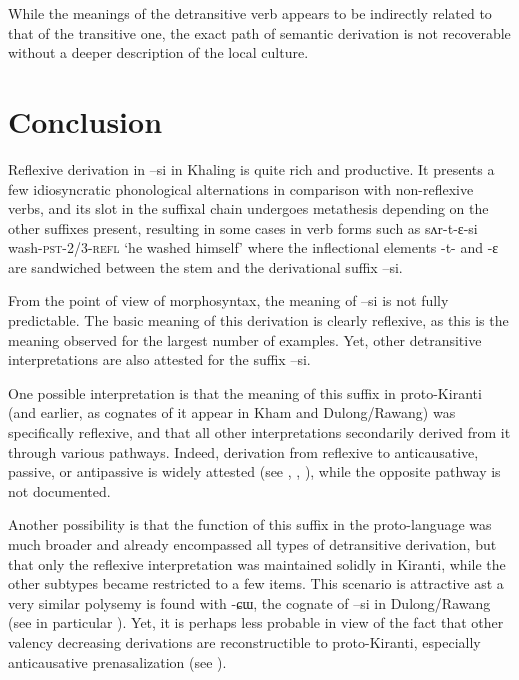 \documentclass[twoside,a4paper,11pt]{article}
\newcommand{\ipa}[1]{{\phon#1}}
\begin{document}
While the meanings of the detransitive verb appears to be indirectly related to that of the transitive one, the exact path of semantic derivation is not recoverable without a deeper description of the local culture.

\section{Conclusion}
Reflexive derivation in \ipa{--si} in Khaling is quite rich and productive. It  presents a few idiosyncratic phonological alternations in comparison with non-reflexive verbs, and its slot in the suffixal chain undergoes metathesis depending on the other suffixes present,  resulting in some cases in verb forms such as \ipa{sʌr-t-ɛ-si} wash-\textsc{pst-2/3-refl} `he washed himself' where the inflectional elements \ipa{-t-} and \ipa{-ɛ} are sandwiched between the stem and the derivational suffix \ipa{--si}.

From the point of view of morphosyntax, the meaning of  \ipa{--si}  is not fully predictable. The basic meaning of this derivation is clearly reflexive, as this is the meaning observed for the largest number of examples. Yet, other detransitive interpretations are also attested for the suffix \ipa{--si}. 

One possible interpretation is that the meaning of this suffix in proto-Kiranti (and earlier, as cognates of it appear in Kham and Dulong/Rawang) was specifically reflexive, and that all other interpretations secondarily  derived from it through various pathways. Indeed, derivation from reflexive to anticausative, passive, or antipassive is widely attested (see \citealt{haspelmath90passive}, \citealt{nedjalkov07reciprocal}, \citealt{say09antipassive}), while the opposite pathway is not documented.


Another possibility is that the function of this suffix in the proto-language was much broader and already encompassed all types of detransitive  derivation, but that only the reflexive interpretation was maintained solidly in Kiranti, while the other subtypes became restricted to a few items. This scenario is attractive ast a very similar polysemy is found with \ipa{-ɕɯ}, the cognate of \ipa{--si} in Dulong/Rawang (see in particular \citealt{lapolla05reflexive}). Yet, it is perhaps less probable in view of the fact that other valency decreasing derivations are reconstructible to proto-Kiranti, especially  anticausative prenasalization (see \citealt{jacques13derivational.khaling}). 
\end{document}
